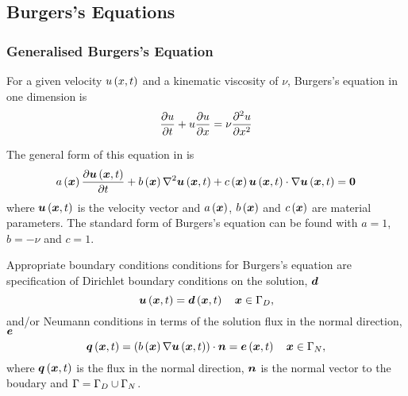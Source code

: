 \subsection{Burgers's Equations}

\subsubsection{Generalised Burgers's Equation}


For a given velocity $ u\left( x,t \right) $ and a kinematic viscosity of $\nu$, Burgers's equation
in one dimension is
\begin{equation}
   \dfrac{\partial u}{\partial t} +u \dfrac{\partial u}{\partial x} =\nu \dfrac{\partial^{2} u}{\partial {x}^{2}} 
  \label{eqn:Burgersequation}
\end{equation}

The general form of this equation in \OpenCMISS is
\begin{equation}
  \fnof{a}{\vect{x}}\delby{\fnof{\vect{u}}{\vect{x},t}}{t}+\fnof{b}{\vect{x}}\laplacian{\fnof{\vect{u}}{\vect{x},t}}+
  \fnof{c}{\vect{x}}\dotprod{\fnof{\vect{u}}{\vect{x},t}}{\gradient{\fnof{\vect{u}}{\vect{x},t}}}=\vect{0}
  \label{eqn:GeneralFormBurgersequation}
\end{equation}
where $\fnof{\vect{u}}{\vect{x},t}$ is the velocity vector and
$\fnof{a}{\vect{x}}$, $\fnof{b}{\vect{x}}$ and $\fnof{c}{\vect{x}}$ are
material parameters. The standard form of Burgers's equation can be found with
$a=1$, $b=-\nu$ and $c=1$.

Appropriate boundary conditions conditions for Burgers's
equation are specification of Dirichlet boundary conditions on the solution,
$\vect{d}$ \ie
\begin{equation}
  \fnof{\vect{u}}{\vect{x},t} = \fnof{\vect{d}}{\vect{x},t} \quad \vect{x}\in\Gamma_{D},
  \label{eqn:BurgersDirichletBC} 
\end{equation}
and/or Neumann conditions in terms of the solution flux in the normal
direction, $\vect{e}$ \ie
\begin{equation}
  \fnof{\vect{q}}{\vect{x},t} = \dotprod{\pbrac{\fnof{b}{\vect{x}}
      \gradient{\fnof{\vect{u}}{\vect{x},t}}}}{\normal} =
  \fnof{\vect{e}}{\vect{x},t} \quad \vect{x}\in\Gamma_{N},
  \label{eqn:BurgersNeumannBC} 
\end{equation}
where $\fnof{\vect{q}}{\vect{x},t}$ is the flux in the normal direction, $\normal$ is the normal
vector to the boudary and $\Gamma=\Gamma_{D}\cup\Gamma_{N}$.

